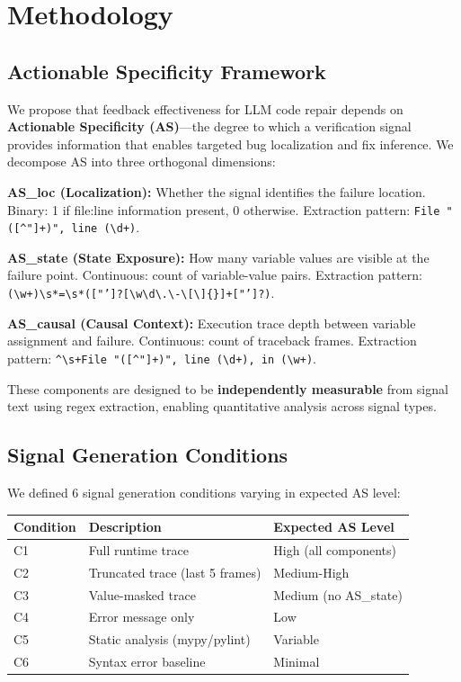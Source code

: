 \section{Methodology}

\subsection{Actionable Specificity Framework}

We propose that feedback effectiveness for LLM code repair depends on \textbf{Actionable Specificity (AS)}---the degree to which a verification signal provides information that enables targeted bug localization and fix inference. We decompose AS into three orthogonal dimensions:

\textbf{AS\_loc (Localization):} Whether the signal identifies the failure location. Binary: 1 if file:line information present, 0 otherwise. Extraction pattern: \texttt{File "([{\textasciicircum}"]+)", line (\textbackslash d+)}.

\textbf{AS\_state (State Exposure):} How many variable values are visible at the failure point. Continuous: count of variable-value pairs. Extraction pattern: \texttt{(\textbackslash w+)\textbackslash s*=\textbackslash s*(["']?[\textbackslash w\textbackslash d\textbackslash.\textbackslash-\textbackslash[\textbackslash]\{\}]+["']?)}.

\textbf{AS\_causal (Causal Context):} Execution trace depth between variable assignment and failure. Continuous: count of traceback frames. Extraction pattern: \texttt{{\textasciicircum}\textbackslash s+File "([{\textasciicircum}"]+)", line (\textbackslash d+), in (\textbackslash w+)}.

These components are designed to be \textbf{independently measurable} from signal text using regex extraction, enabling quantitative analysis across signal types.

\subsection{Signal Generation Conditions}

We defined 6 signal generation conditions varying in expected AS level:

\begin{table}[h]
\centering
\begin{tabular}{@{}lll@{}}
\toprule
Condition & Description & Expected AS Level \\
\midrule
C1 & Full runtime trace & High (all components) \\
C2 & Truncated trace (last 5 frames) & Medium-High \\
C3 & Value-masked trace & Medium (no AS\_state) \\
C4 & Error message only & Low \\
C5 & Static analysis (mypy/pylint) & Variable \\
C6 & Syntax error baseline & Minimal \\
\bottomrule
\end{tabular}
\end{table}


